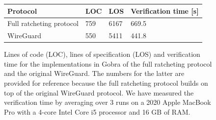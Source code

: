 \begin{figure}
    \centering
    \begin{tabular}{@{}llll@{}}
        \toprule
        Protocol                 & LOC & LOS  & Verification time {[}s{]} \\ \midrule
        Full ratcheting protocol & 759 & 6167 & 669.5                     \\
        WireGuard                & 550 & 5411 & 441.8                     \\
        \bottomrule
    \end{tabular}
    \caption{Lines of code (LOC), lines of specification (LOS) and verification time for the implementations in Gobra of the full ratcheting protocol and the original WireGuard. The numbers for the latter are provided for reference because the full ratcheting protocol builds on top of the original WireGuard protocol. We have measured the verification time by averaging over 3 runs on a 2020 Apple MacBook Pro with a 4-core Intel Core i5 processor and 16 GB of RAM.}
    \label{fig:results}
\end{figure}



